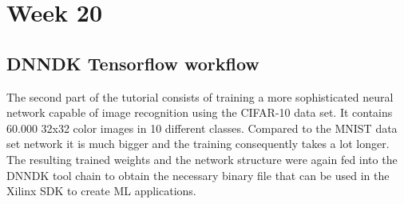 \section{Week 20}
\subsection{\acs{DNNDK} Tensorflow workflow}
The second part of the tutorial consists of training a more sophisticated neural network capable of image recognition using the \ac{CIFAR}-10 data set. It contains 60.000 32x32 color images in 10 different classes. Compared to the \ac{MNIST} data set network it is much bigger and the training consequently takes a lot longer. The resulting trained weights and the network structure were again fed into the \ac{DNNDK} tool chain to obtain the necessary binary file that can be used in the Xilinx \ac{SDK} to create \ac{ML} applications.
